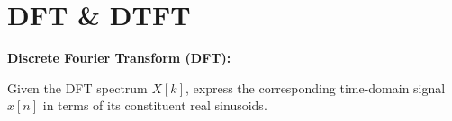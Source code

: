 \documentclass[a4paper, 10pt]{article}
\begin{document}
\subject[2110203 - Computer Engineering Mathematics II]


\section{DFT \& DTFT}


\begin{problem}
    \textbf{Discrete Fourier Transform (DFT):}
\end{problem}

\begin{subproblems}
    \item Given the DFT spectrum \( X[k] \), express the corresponding time-domain signal \( x[n] \) in terms of its constituent real sinusoids.
\end{subproblems}
\end{document}
